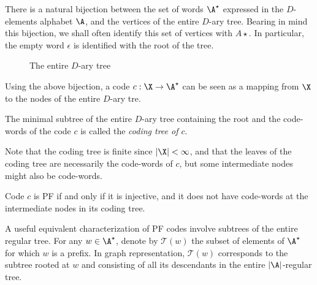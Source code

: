 \documentclass[toc, titlepaged]{../cs-classes/cs-classes}
\begin{document}
\begin{remark}
    There is a natural bijection between the set of words $\A^\star$ expressed in the $D$-elements alphabet $\A$, and the vertices of the entire $D$-ary tree. Bearing in mind this bijection, we shall often identify this set of vertices with $A\star$. In particular, the empty word $\epsilon$ is identified with the root of the tree.
    
    \begin{figure}[!ht]
        \center
        \caption{The entire $D$-ary tree}
    \end{figure}

    Using the above bijection, a code $c:\X\to\A^\star$ can be seen as a mapping from $\X$ to the nodes of the entire $D$-ary tre.
\end{remark}

\begin{definition}
    The minimal subtree of the entire $D$-ary tree containing the root and the code-words of the code $c$ is called the \emph{coding tree of $c$}.

    Note that the coding tree is finite since $|\X|<\infty$, and that the leaves of the coding tree are necessarily the code-words of $c$, but some intermediate nodes might also be code-words.
\end{definition}

\begin{lemma}
    \label{lem:pf-coding-trees}
    Code $c$ is PF if and only if it is injective, and it does not have code-words at the intermediate nodes in its coding tree.
\end{lemma}

A useful equivalent characterization of PF codes involve subtrees of the entire regular tree. For any $w\in\A^\star$, denote by $\mathcal{T}(w)$ the subset of elements of $\A^\star$ for which $w$ is a prefix. In graph representation, $\mathcal{T}(w)$ corresponds to the subtree rooted at $w$ and consisting of all its descendants in the entire $|\A|$-regular tree.
\end{document}
